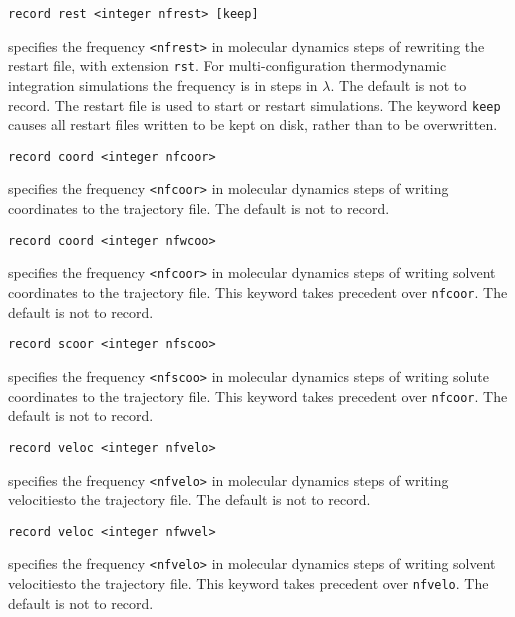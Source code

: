 \begin{description}

\item
\begin{verbatim}
record rest <integer nfrest> [keep]
\end{verbatim}
specifies the frequency \verb+<nfrest>+ in molecular dynamics steps
of rewriting the restart file, with extension \verb+rst+. 
For multi-configuration
thermodynamic integration simulations the frequency is in
steps in $\lambda$. The default is not to record. The restart
file is used to start or restart simulations. The keyword {\tt keep}
causes all restart files written to be kept on disk, rather than
to be overwritten.

\item
\begin{verbatim}
record coord <integer nfcoor>
\end{verbatim}
specifies the frequency \verb+<nfcoor>+ in molecular dynamics steps
of writing coordinates to the trajectory file.
The default is not to record.

\item
\begin{verbatim}
record coord <integer nfwcoo>
\end{verbatim}
specifies the frequency \verb+<nfcoor>+ in molecular dynamics steps
of writing solvent coordinates to the trajectory file. This keyword
takes precedent over \verb+nfcoor+.
The default is not to record.

\item
\begin{verbatim}
record scoor <integer nfscoo>
\end{verbatim}
specifies the frequency \verb+<nfscoo>+ in molecular dynamics steps
of writing solute coordinates to the trajectory file. This keyword
takes precedent over \verb+nfcoor+.
The default is not to record.

\item
\begin{verbatim}
record veloc <integer nfvelo>
\end{verbatim}
specifies the frequency \verb+<nfvelo>+ in molecular dynamics steps
of writing velocitiesto the trajectory file.
The default is not to record.

\item
\begin{verbatim}
record veloc <integer nfwvel>
\end{verbatim}
specifies the frequency \verb+<nfvelo>+ in molecular dynamics steps
of writing solvent velocitiesto the trajectory file. This keyword
takes precedent over \verb+nfvelo+.
The default is not to record.


\end{description}
